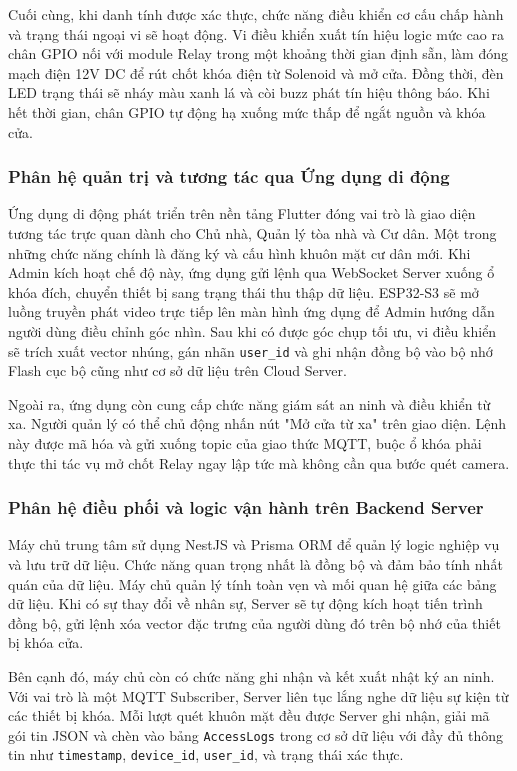 Cuối cùng, khi danh tính được xác thực, chức năng điều khiển cơ cấu chấp hành và trạng thái ngoại vi sẽ hoạt động. Vi điều khiển xuất tín hiệu logic mức cao ra chân GPIO nối với module Relay trong một khoảng thời gian định sẵn, làm đóng mạch điện 12V DC để rút chốt khóa điện từ Solenoid và mở cửa. Đồng thời, đèn LED trạng thái sẽ nháy màu xanh lá và còi buzz phát tín hiệu thông báo. Khi hết thời gian, chân GPIO tự động hạ xuống mức thấp để ngắt nguồn và khóa cửa.

\subsubsection{Phân hệ quản trị và tương tác qua Ứng dụng di động}
Ứng dụng di động phát triển trên nền tảng Flutter đóng vai trò là giao diện tương tác trực quan dành cho Chủ nhà, Quản lý tòa nhà và Cư dân. Một trong những chức năng chính là đăng ký và cấu hình khuôn mặt cư dân mới. Khi Admin kích hoạt chế độ này, ứng dụng gửi lệnh qua WebSocket Server xuống ổ khóa đích, chuyển thiết bị sang trạng thái thu thập dữ liệu. ESP32-S3 sẽ mở luồng truyền phát video trực tiếp lên màn hình ứng dụng để Admin hướng dẫn người dùng điều chỉnh góc nhìn. Sau khi có được góc chụp tối ưu, vi điều khiển sẽ trích xuất vector nhúng, gán nhãn \texttt{user\_id} và ghi nhận đồng bộ vào bộ nhớ Flash cục bộ cũng như cơ sở dữ liệu trên Cloud Server.

Ngoài ra, ứng dụng còn cung cấp chức năng giám sát an ninh và điều khiển từ xa. Người quản lý có thể chủ động nhấn nút "Mở cửa từ xa" trên giao diện. Lệnh này được mã hóa và gửi xuống topic của giao thức MQTT, buộc ổ khóa phải thực thi tác vụ mở chốt Relay ngay lập tức mà không cần qua bước quét camera.

\subsubsection{Phân hệ điều phối và logic vận hành trên Backend Server}
Máy chủ trung tâm sử dụng NestJS và Prisma ORM để quản lý logic nghiệp vụ và lưu trữ dữ liệu. Chức năng quan trọng nhất là đồng bộ và đảm bảo tính nhất quán của dữ liệu. Máy chủ quản lý tính toàn vẹn và mối quan hệ giữa các bảng dữ liệu. Khi có sự thay đổi về nhân sự, Server sẽ tự động kích hoạt tiến trình đồng bộ, gửi lệnh xóa vector đặc trưng của người dùng đó trên bộ nhớ của thiết bị khóa cửa.

Bên cạnh đó, máy chủ còn có chức năng ghi nhận và kết xuất nhật ký an ninh. Với vai trò là một MQTT Subscriber, Server liên tục lắng nghe dữ liệu sự kiện từ các thiết bị khóa. Mỗi lượt quét khuôn mặt đều được Server ghi nhận, giải mã gói tin JSON và chèn vào bảng \texttt{AccessLogs} trong cơ sở dữ liệu với đầy đủ thông tin như \texttt{timestamp}, \texttt{device_id}, \texttt{user_id}, và trạng thái xác thực.

